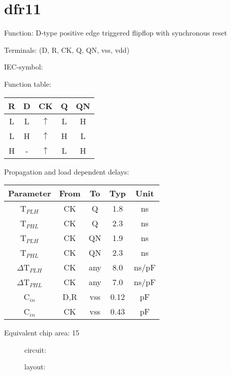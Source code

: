 \section{dfr11}

Function: D-type positive edge triggered flipflop with synchronous reset

Terminals: (D, R, CK, Q, QN, vss, vdd)


IEC-symbol:
\begin{figure}[bth]
\end{figure}

Function table:
\begin{table}[bth]
\begin{tabular}{|c|c|c||c|c|}
\hline
R	&D	&CK		&Q	&QN\\
\hline
L	&L	&$\uparrow$	&L	&H\\
L	&H	&$\uparrow$	&H	&L\\
H	&-	&$\uparrow$	&L	&H\\
\hline
\end{tabular}
\vspace{1cm}

Propagation and load dependent delays:\\

\begin{tabular}{|c|c|c|c|c|}
\hline
Parameter               &From            &To   &Typ    &Unit\\
\hline
T$_{PLH}$               &CK     	&Q      &1.8    &ns\\
T$_{PHL}$               &CK    		&Q      &2.3    &ns\\
T$_{PLH}$               &CK     	&QN     &1.9    &ns\\
T$_{PHL}$               &CK    		&QN     &2.3    &ns\\
\hline
$\Delta$T$_{PLH}$       &CK          	&any    &8.0    &ns/pF\\
$\Delta$T$_{PHL}$       &CK           	&any    &7.0    &ns/pF\\
\hline
C$_{in}$                &D,R	    	&vss    &0.12   &pF\\
C$_{in}$                &CK	    	&vss    &0.43   &pF\\
\hline
\end{tabular}
\end{table}

Equivalent chip area: 15


\begin{figure}[t]
circuit:\\

\end{figure}

\begin{figure}[bth]
layout:\\

\end{figure}

\clearpage
